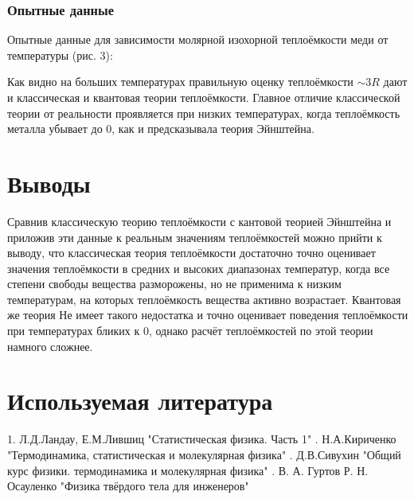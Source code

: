 \documentclass[a4paper, 12pt]{article}
\begin{document}
\subsubsection{Опытные данные}

Опытные данные для зависимости молярной изохорной теплоёмкости меди от температуры (рис. 3):

 \begin{figure}[H]
 \end{figure}


Как видно на больших температурах правильную оценку теплоёмкости $\sim 3R$ дают и классическая
и квантовая теории теплоёмкости. Главное отличие классической теории от реальности проявляется
при низких температурах, когда теплоёмкость металла убывает до 0, как и предсказывала теория
Эйнштейна.

\section{Выводы}

Сравнив классическую теорию теплоёмкости с кантовой теорией Эйнштейна и приложив эти данные
к реальным значениям теплоёмкостей можно прийти к выводу, что классическая теория теплоёмкости
достаточно точно оценивает значения теплоёмкости в средних и высоких диапазонах температур, когда
все степени свободы вещества разморожены, но не применима к низким температурам, на которых
теплоёмкость вещества активно возрастает. Квантовая же теория Не имеет такого недостатка и точно
оценивает поведения теплоёмкости при температурах бликих к 0, однако расчёт теплоёмкостей по этой
теории намного сложнее.

\section{Используемая литература}
1. Л.Д.Ландау, Е.М.Лившиц "Статистическая физика. Часть 1"  . Н.А.Кириченко "Термодинамика, статистическая и молекулярная физика" . Д.В.Сивухин "Общий курс физики. термодинамика и молекулярная физика" . В. А. Гуртов Р. Н. Осауленко "Физика твёрдого тела для инженеров" \newline
\end{document}
